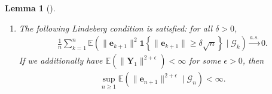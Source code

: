 \documentclass[10pt,a4paper]{amsart}
\newtheorem{lemma}{Lemma}
\begin{document}
\begin{lemma}[]
{\begin{enumerate}
Additionally, if $\boldsymbol{\Gamma}_n \stackrel{a.s.}{\to} \boldsymbol{x}_0$ for some $\boldsymbol{x}_0 \in {D}_s$ and $\boldsymbol{\mathcal{P}}$ is continuous at $\boldsymbol{x}_0$, then
\begin{align}\label{eq:lem-Sigmaconv}
\sigma^2\left(\boldsymbol{\Gamma}_{n}\right) \stackrel{a.s.}{\to} \sigma^2\left(\boldsymbol{x}_0\right), \quad \boldsymbol{\Sigma}\left(\boldsymbol{\Gamma}_{n}\right) \stackrel{a.s.}{\to} \boldsymbol{\Sigma}\left(\boldsymbol{x}_0\right).
\end{align}
\item{}\label{item3} The following Lindeberg condition is satisfied: for all $\delta > 0$,
    \begin{align}\label{eq:lind}
    \frac{1}{n}\sum_{k=1}^{n}\mathbb{E}\left( \|\boldsymbol{e}_{k+1}\|^2 \mathbf{1}\left\{\|\boldsymbol{e}_{k+1}\| \geq \delta\sqrt{n}\right\}\mid \mathcal{G}_{k}\right) \stackrel{a.s.}{\to} 0.
    \end{align}
If we additionally have $\mathbb{E}\left(\|\boldsymbol{Y}_1\|^{2+\epsilon}\right) < \infty$ for some $\epsilon > 0$, then
\begin{align}\label{eq:sup}
        \sup_{n \geq 1} \mathbb{E}\left( \|\boldsymbol{e}_{n+1}\|^{2+\epsilon} \mid \mathcal{G}_{n}\right) < \infty.
\end{align}
\end{enumerate}}
\end{lemma}
\end{document}
